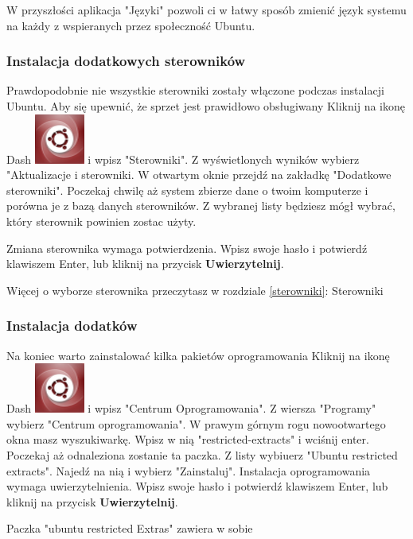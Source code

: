 W przyszłości aplikacja "Języki" pozwoli ci w łatwy sposób zmienić język systemu na każdy z wspieranych przez społeczność Ubuntu.
\clearpage
\subsubsection{Instalacja dodatkowych sterowników}
Prawdopodobnie nie wszystkie sterowniki zostały włączone podczas instalacji Ubuntu. Aby się upewnić, że sprzet jest prawidłowo obsługiwany Kliknij na ikonę Dash \includegraphics[scale=0.35]{images/ikony_dash.png} i wpisz "Sterowniki". Z wyświetlonych wyników wybierz "Aktualizacje i sterowniki. W otwartym oknie przejdź na zakładkę "Dodatkowe sterowniki". Poczekaj chwilę aż system zbierze dane o twoim komputerze i porówna je z bazą danych sterowników. Z wybranej listy będziesz mógł wybrać, który sterownik powinien zostac użyty.

Zmiana sterownika wymaga potwierdzenia. Wpisz swoje hasło i potwierdź klawiszem Enter, lub kliknij na przycisk \textbf{Uwierzytelnij}.

Więcej o wyborze sterownika przeczytasz w rozdziale \ref{sterowniki}: Sterowniki
\clearpage
\subsubsection{Instalacja dodatków}
Na koniec warto zainstalować kilka pakietów oprogramowania Kliknij na ikonę Dash \includegraphics[scale=0.35]{images/ikony_dash.png} i wpisz "Centrum Oprogramowania". Z wiersza "Programy" wybierz "Centrum oprogramowania". W prawym górnym rogu nowootwartego okna masz wyszukiwarkę. Wpisz w nią "restricted-extracts" i wciśnij enter. Poczekaj aż odnaleziona zostanie ta paczka. Z listy wybiuerz "Ubuntu restricted extracts". Najedź na nią i wybierz "Zainstaluj". Instalacja oprogramowania wymaga uwierzytelnienia. Wpisz swoje hasło i potwierdź klawiszem Enter, lub kliknij na przycisk \textbf{Uwierzytelnij}.

Paczka "ubuntu restricted Extras" zawiera w sobie
\clearpage